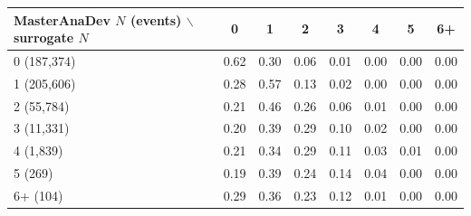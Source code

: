 \begin{tabular}{lccccccc}
\toprule
MasterAnaDev $N$ (events) $\backslash$ surrogate $N$ & 0 & 1 & 2 & 3 & 4 & 5 & 6+ \\
\midrule
0 (187,374) & 0.62 & 0.30 & 0.06 & 0.01 & 0.00 & 0.00 & 0.00 \\
1 (205,606) & 0.28 & 0.57 & 0.13 & 0.02 & 0.00 & 0.00 & 0.00 \\
2 (55,784) & 0.21 & 0.46 & 0.26 & 0.06 & 0.01 & 0.00 & 0.00 \\
3 (11,331) & 0.20 & 0.39 & 0.29 & 0.10 & 0.02 & 0.00 & 0.00 \\
4 (1,839) & 0.21 & 0.34 & 0.29 & 0.11 & 0.03 & 0.01 & 0.00 \\
5 (269) & 0.19 & 0.39 & 0.24 & 0.14 & 0.04 & 0.00 & 0.00 \\
6+ (104) & 0.29 & 0.36 & 0.23 & 0.12 & 0.01 & 0.00 & 0.00 \\
\bottomrule
\end{tabular}
